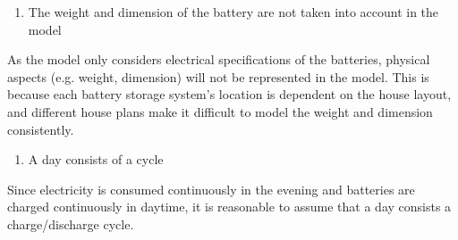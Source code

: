 \begin{enumerate}
    \item The weight and dimension of the battery are not taken into account in the model
\end{enumerate}
As the model only considers  electrical specifications of the batteries, physical aspects (e.g. weight, dimension) will not be represented in the model. This is because each battery storage system's location is dependent on the house layout, and different house plans make it difficult to model the weight and dimension consistently.
\begin{comment}
\begin{enumerate}[resume]
    \item The battery array might be heterogeneous (i.e. having multiple types of batteries in the same system)
\end{enumerate}
In order to optimise both the cost and efficiency of the system, our team will test several layouts that make use of multiple types of batteries (i.e. lithium-ion batteries, lead-acid batteries, LFP batteries). The main reason for this is to evaluate the model more fairly, which helps us develop a stronger solution.
\end{comment}
\begin{enumerate}[resume]
    \item A day consists of a cycle
\end{enumerate}
Since electricity is consumed continuously in the evening and batteries are charged continuously in daytime, it is reasonable to assume that a day consists a charge/discharge cycle.